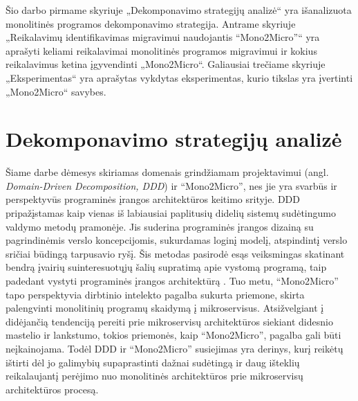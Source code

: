 \documentclass{VUMIFPSbakalaurinis}
\begin{document}
Šio darbo pirmame skyriuje „Dekomponavimo strategijų analizė“ yra išanalizuota monolitinės programos dekomponavimo strategija. Antrame skyriuje „Reikalavimų identifikavimas migravimui naudojantis \enquote{Mono2Micro}“ yra aprašyti keliami reikalavimai monolitinės programos migravimui ir kokius reikalavimus ketina įgyvendinti „Mono2Micro“. Galiausiai trečiame skyriuje „Eksperimentas“ yra aprašytas vykdytas eksperimentas, kurio tikslas yra įvertinti „Mono2Micro“ savybes.


\section{Dekomponavimo strategijų analizė}
Šiame darbe dėmesys skiriamas domenais grindžiamam projektavimui (angl. \emph{Domain-Driven Decomposition, DDD}) ir \enquote{Mono2Micro}, nes jie yra svarbūs ir perspektyvūs programinės įrangos architektūros keitimo srityje. DDD pripažįstamas kaip vienas iš labiausiai paplitusių didelių sistemų sudėtingumo valdymo metodų pramonėje. Jis suderina programinės įrangos dizainą su pagrindinėmis verslo koncepcijomis, sukurdamas loginį modelį, atspindintį verslo sričiai būdingą tarpusavio ryšį. Šis metodas pasirodė esąs veiksmingas skatinant bendrą įvairių suinteresuotųjų šalių supratimą apie vystomą programą, taip padedant vystyti programinės įrangos architektūrą \cite{New19}. Tuo metu, \enquote{Mono2Micro} tapo perspektyvia dirbtinio intelekto pagalba sukurta priemone, skirta palengvinti monolitinių programų skaidymą į mikroservisus. Atsižvelgiant į didėjančią tendenciją pereiti prie mikroservisų architektūros siekiant didesnio mastelio ir lankstumo, tokios priemonės, kaip \enquote{Mono2Micro}, pagalba gali būti neįkainojama. Todėl DDD ir \enquote{Mono2Micro} susiejimas yra derinys, kurį reikėtų ištirti dėl jo galimybių supaprastinti dažnai sudėtingą ir daug išteklių reikalaujantį perėjimo nuo monolitinės architektūros prie mikroservisų architektūros procesą.
\end{document}
